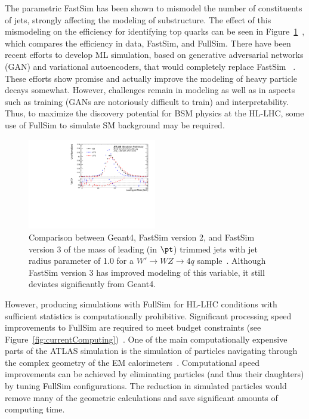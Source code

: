 \documentclass[letter, USenglish, 11pt, subfigure]{article}
\begin{document}
The parametric FastSim has been shown to mismodel the number of constituents of jets, strongly affecting the modeling of substructure. The effect of this mismodeling on the efficiency for identifying top quarks can be seen in Figure~\ref{fig:wMass}~\cite{AF3vCHEP2021}, which compares the efficiency in data, FastSim, and FullSim. There have been recent efforts to develop ML simulation, based on generative adversarial networks (GAN) and variational autoencoders, that would completely replace FastSim ~\cite{calogan,atlasgan}. These efforts show promise and actually improve the modeling of heavy particle decays somewhat. However, challenges remain in modeling as well as in aspects such as training (GANs are notoriously difficult to train) and interpretability. Thus, to maximize the discovery potential for BSM physics at the HL-LHC, some use of FullSim to simulate SM background may be required. 

\begin{figure}
  \centering
  \includegraphics[width=0.5\textwidth]{figures/af3_jetmassR10.pdf}
  \caption{\label{fig:wMass} Comparison between Geant4, FastSim version 2, and FastSim version 3 of the mass of leading (in $\pt$) trimmed jets with jet radius parameter of 1.0 for a $W'\to WZ \to 4q$ sample~\cite{AF3vCHEP2021}. Although FastSim version 3 has improved modeling of this variable, it still deviates significantly from Geant4. }
\end{figure}

However, producing simulations with FullSim for HL-LHC conditions with sufficient statistics is computationally prohibitive. Significant processing speed improvements to FullSim are required to meet budget constraints (see Figure~\ref{fig:currentComputing})~\cite{computingCDR}. One of the main computationally expensive parts of the ATLAS simulation is the simulation of particles navigating through the complex geometry of the EM calorimeters~\cite{Muskinja:2753974}. Computational speed improvements can be achieved by eliminating particles (and thus their daughters) by tuning FullSim configurations. The reduction in simulated particles would remove many of the geometric calculations and save significant amounts of computing time.
\end{document}
